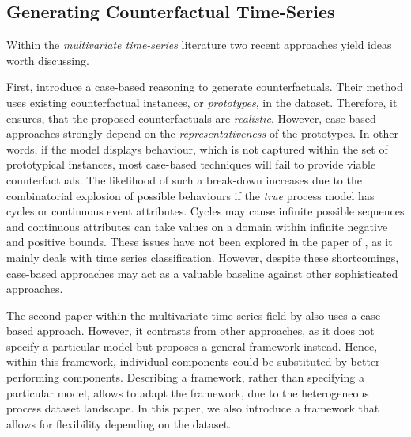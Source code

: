 \documentclass[./../../paper.tex]{subfiles}
\begin{document}
\subsection{Generating Counterfactual Time-Series}
Within the \emph{multivariate time-series} literature two recent approaches yield ideas worth discussing.

First, \citeauthor{delaney_InstanceBasedCounterfactualExplanations_2021} introduce a case-based reasoning to generate counterfactuals\autocite{delaney_InstanceBasedCounterfactualExplanations_2021}. Their method uses existing counterfactual instances, or \emph{prototypes}, in the dataset. Therefore, it ensures, that the proposed counterfactuals are \emph{realistic}. However, case-based approaches strongly depend on the \emph{representativeness} of the prototypes\autocite[p. 192]{molnar2019}. In other words, if the model displays behaviour, which is not captured within the set of prototypical instances, most case-based techniques will fail to provide viable counterfactuals. The likelihood of such a break-down increases due to the combinatorial explosion of possible behaviours if the \emph{true} process model has cycles or continuous event attributes. Cycles may cause infinite possible sequences and continuous attributes can take values on a domain within infinite negative and positive bounds. These issues have not been explored in the paper of \citeauthor{delaney_InstanceBasedCounterfactualExplanations_2021}, as it mainly deals with time series classification\autocite{delaney_InstanceBasedCounterfactualExplanations_2021}. However, despite these shortcomings, case-based approaches may act as a valuable baseline against other sophisticated approaches.

The second paper within the multivariate time series field by \citeauthor{ates_CounterfactualExplanationsMultivariate_2021} also uses a case-based approach\autocite{ates_CounterfactualExplanationsMultivariate_2021}. However, it contrasts from other approaches, as it does not specify a particular model but proposes a general framework instead. Hence, within this framework, individual components could be substituted by better performing components. Describing a framework, rather than specifying a particular model, allows to adapt the framework, due to the heterogeneous process dataset landscape. In this paper, we also introduce a framework that allows for flexibility depending on the dataset. 
\end{document}
